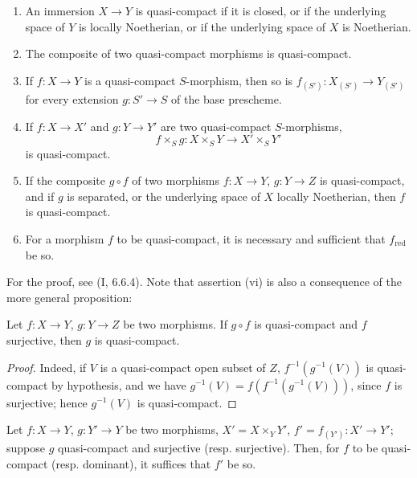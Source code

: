 \begin{proposition}[1.1.2]
\label{IV.1.1.2}
\begin{enumerate}
  \item[(i)] An immersion $X\to Y$ is quasi-compact if it is closed, or if
  the underlying space of $Y$ is locally Noetherian, or if the underlying
  space of $X$ is Noetherian.
  \item[(ii)] The composite of two quasi-compact morphisms is quasi-compact.
  \item[(iii)] If $f:X\to Y$ is a quasi-compact $S$-morphism, then so is
  $f_{(S')}:X_{(S')}\to Y_{(S')}$ for every extension $g:S'\to S$ of the
  base prescheme.
  \item[(iv)] If $f:X\to X'$ and $g:Y\to Y'$ are two quasi-compact
  $S$-morphisms,
  \[
    f\times_S g:X\times_S Y\to X'\times_S Y'
  \]
  is quasi-compact.
  \item[(v)] If the composite $g\circ f$ of two morphisms $f:X\to Y$, $g:Y\to Z$
  is quasi-compact, and if $g$ is separated, or the underlying space of $X$
  locally Noetherian, then $f$ is quasi-compact.
  \item[(vi)] For a morphism $f$ to be quasi-compact, it is necessary and
  sufficient that $f_{\mathrm{red}}$ be so.
\end{enumerate}
\end{proposition}

For the proof, see (I, 6.6.4). Note that assertion (vi) is
also a consequence of the more general proposition:

\begin{proposition}[1.1.3]
\label{IV.1.1.3}
Let $f:X\to Y$, $g:Y\to Z$ be two morphisms. If $g\circ f$ is
quasi-compact and $f$ surjective, then $g$ is quasi-compact.
\end{proposition}

\begin{proof}
Indeed, if $V$ is a quasi-compact open subset of $Z$,
$f^{-1}(g^{-1}(V))$ is quasi-compact by hypothesis, and we have
$g^{-1}(V)=f(f^{-1}(g^{-1}(V)))$, since $f$ is surjective; hence
$g^{-1}(V)$ is quasi-compact.
\end{proof}

\begin{corollary}[1.1.4]
\label{IV.1.1.4}
Let $f:X\to Y$, $g:Y'\to Y$ be two morphisms, $X'=X\times_Y Y'$,
$f'=f_{(Y')}:X'\to Y'$; suppose $g$ quasi-compact and surjective (resp.
surjective). Then, for $f$ to be quasi-compact (resp. dominant), it suffices
that $f'$ be so.
\end{corollary}

